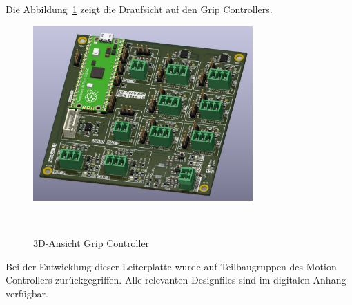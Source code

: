 \documentclass[main.tex]{subfiles} %
\begin{document}
Die Abbildung~\ref{fig:GripController_3D} zeigt die Draufsicht auf den Grip
Controllers.

\begin{figure}[H]
      \centering
      \includegraphics[width=0.75\textwidth]{./fig_GripController/GripController_3D.pdf}
      \caption{3D-Ansicht Grip Controller}~\label{fig:GripController_3D}
\end{figure}

Bei der Entwicklung dieser Leiterplatte wurde auf Teilbaugruppen des Motion
Controllers zurückgegriffen. Alle relevanten Designfiles sind im digitalen
Anhang verfügbar.
\end{document}
